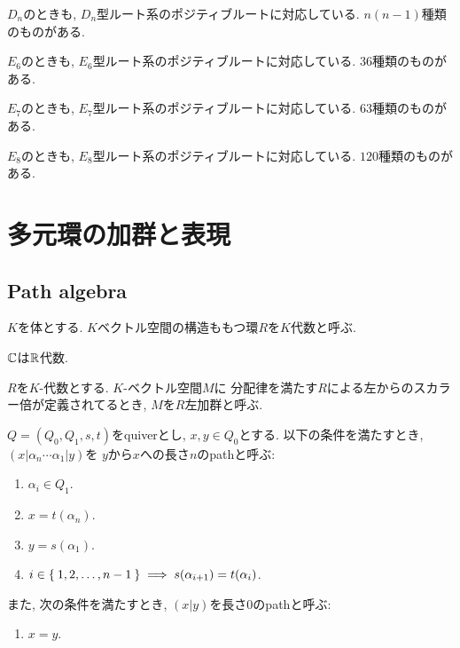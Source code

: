 \begin{example}
  $D_n$のときも,
  $D_n$型ルート系のポジティブルートに対応している.
  $n(n-1)$種類のものがある.
\end{example}
\begin{example}
  $E_6$のときも,
  $E_6$型ルート系のポジティブルートに対応している.
  $36$種類のものがある.
\end{example}
\begin{example}
  $E_7$のときも,
  $E_7$型ルート系のポジティブルートに対応している.
  $63$種類のものがある.
\end{example}
\begin{example}
  $E_8$のときも,
  $E_8$型ルート系のポジティブルートに対応している.
  $120$種類のものがある.
\end{example}

\chapter{多元環の加群と表現}

\section{Path algebra}
$K$を体とする.
$K$ベクトル空間の構造ももつ環$R$を$K$代数と呼ぶ.
\begin{example}
  $\mathbb{C}$は$\mathbb{R}$代数.
\end{example}
$R$を$K$-代数とする.
$K$-ベクトル空間$M$に
分配律を満たす$R$による左からのスカラー倍が定義されてるとき,
$M$を$R$左加群と呼ぶ.

\begin{definition}
  $Q=(Q_0,Q_1,s,t)$をquiverとし,
  $x,y\in Q_0$とする.
  以下の条件を満たすとき,
  $(x|\alpha_n\cdots\alpha_1|y)$を
  $y$から$x$への長さ$n$のpathと呼ぶ:
  \begin{enumerate}
    \item $\alpha_i\in Q_1$.
    \item $x=t(\alpha_n)$.
    \item $y=s(\alpha_1)$.
    \item $i\in \Set{1,2,\ldots,n-1}\implies s(\alpha_{i+1})=t(\alpha_{i})$.
  \end{enumerate}
  また,
  次の条件を満たすとき,
  $(x|y)$を長さ0のpathと呼ぶ:
  \begin{enumerate}
    \item $x=y$.
  \end{enumerate}
\end{definition}

